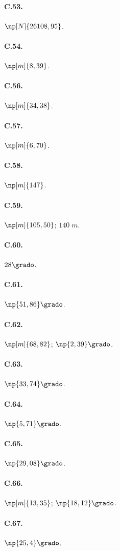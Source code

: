 \begin{multicols}{3}
\paragraph{C.53.}$\np[N]{26108,95}$.

\paragraph{C.54.}$\np[m]{8,39}$.

\paragraph{C.56.}$\np[m]{34,38}$.

\paragraph{C.57.}$\np[m]{6,70}$.

\paragraph{C.58.}$\np[m]{147}$.

\paragraph{C.59.}$\np[m]{105,50}$; $140\;\unit{m}$.

\paragraph{C.60.}$28\grado$.

\paragraph{C.61.}$\np{51,86}\grado$.

\paragraph{C.62.}$\np[m]{68,82}$; $\np{2,39}\grado$.

\paragraph{C.63.}$\np{33,74}\grado$.

\paragraph{C.64.}$\np{5,71}\grado$.

\paragraph{C.65.}$\np{29,08}\grado$.

\paragraph{C.66.}$\np[m]{13,35}$; $\np{18,12}\grado$.

\paragraph{C.67.}$\np{25,4}\grado$.
\end{multicols}
